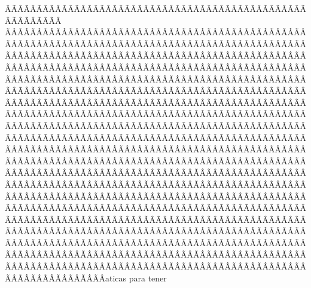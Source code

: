 \begin{sumilla}
\begin{fundamentacion}
ÂÃÂÃÂÃÂÃÂÃÂÃÂÃÂÃÂÃÂÃÂÃÂÃÂÃÂÃÂÃÂÃÂÃÂÃÂÃÂÃÂÃÂÃÂÃÂÃÂÃÂÃÂÃÂÃÂÃÂÃÂÃÂÃÂÃÂÃÂÃÂÃÂÃÂÃÂÃÂÃÂÃÂÃÂÃÂÃÂÃÂÃÂÃÂÃÂÃÂÃÂÃÂÃÂÃÂÃÂÃÂÃÂÃÂÃÂÃÂÃÂÃÂÃÂÃÂÃÂÃÂÃÂÃÂÃÂÃÂÃÂÃÂÃÂÃÂÃÂÃÂÃÂÃÂÃÂÃÂÃÂÃÂÃÂÃÂÃÂÃÂÃÂÃÂÃÂÃÂÃÂÃÂÃÂÃÂÃÂÃÂÃÂÃÂÃÂÃÂÃÂÃÂÃÂÃÂÃÂÃÂÃÂÃÂÃÂÃÂÃÂÃÂÃÂÃÂÃÂÃÂÃÂÃÂÃÂÃÂÃÂÃÂÃÂÃÂÃÂÃÂÃÂÃÂÃÂÃÂÃÂÃÂÃÂÃÂÃÂÃÂÃÂÃÂÃÂÃÂÃÂÃÂÃÂÃÂÃÂÃÂÃÂÃÂÃÂÃÂÃÂÃÂÃÂÃÂÃÂÃÂÃÂÃÂÃÂÃÂÃÂÃÂÃÂÃÂÃÂÃÂÃÂÃÂÃÂÃÂÃÂÃÂÃÂÃÂÃÂÃÂÃÂÃÂÃÂÃÂÃÂÃÂÃÂÃÂÃÂÃÂÃÂÃÂÃÂÃÂÃÂÃÂÃÂÃÂÃÂÃÂÃÂÃÂÃÂÃÂÃÂÃÂÃÂÃÂÃÂÃÂÃÂÃÂÃÂÃÂÃÂÃÂÃÂÃÂÃÂÃÂÃÂÃÂÃÂÃÂÃÂÃÂÃÂÃÂÃÂÃÂÃÂÃÂÃÂÃÂÃÂÃÂÃÂÃÂÃÂÃÂÃÂÃÂÃÂÃÂÃÂÃÂÃÂÃÂÃÂÃÂÃÂÃÂÃÂÃÂÃÂÃÂÃÂÃÂÃÂÃÂÃÂÃÂÃÂÃÂÃÂÃÂÃÂÃÂÃÂÃÂÃÂÃÂÃÂÃÂÃÂÃÂÃÂÃÂÃÂÃÂÃÂÃÂÃÂÃÂÃÂÃÂÃÂÃÂÃÂÃÂÃÂÃÂÃÂÃÂÃÂÃÂÃÂÃÂÃÂÃÂÃÂÃÂÃÂÃÂÃÂÃÂÃÂÃÂÃÂÃÂÃÂÃÂÃÂÃÂÃÂÃÂÃÂÃÂÃÂÃÂÃÂÃÂÃÂÃÂÃÂÃÂÃÂÃÂÃÂÃÂÃÂÃÂÃÂÃÂÃÂÃÂÃÂÃÂÃÂÃÂÃÂÃÂÃÂÃÂÃÂÃÂÃÂÃÂÃÂÃÂÃÂÃÂÃÂÃÂÃÂÃÂÃÂÃÂÃÂÃÂÃÂÃÂÃÂÃÂÃÂÃÂÃÂÃÂÃÂÃÂÃÂÃÂÃÂÃÂÃÂÃÂÃÂÃÂÃÂÃÂÃÂÃÂÃÂÃÂÃÂÃÂÃÂÃÂÃÂÃÂÃÂÃÂÃÂÃÂÃÂÃÂÃÂÃÂÃÂÃÂÃÂÃÂÃÂÃÂÃÂÃÂÃÂÃÂÃÂÃÂÃÂÃÂÃÂÃÂÃÂÃÂÃÂÃÂÃÂÃÂÃÂÃÂÃÂÃÂÃÂÃÂÃÂÃÂÃÂÃÂÃÂÃÂÃÂÃÂÃÂÃÂÃÂÃÂÃÂÃÂÃÂÃÂÃÂÃÂÃÂÃÂÃÂÃÂÃÂÃÂÃÂÃÂÃÂÃÂÃÂÃÂÃÂÃÂÃÂÃÂÃÂÃÂÃÂÃÂÃÂÃÂÃÂÃÂÃÂÃÂÃÂÃÂÃÂÃÂÃÂÃÂÃÂÃÂÃÂÃÂÃÂÃÂÃÂÃÂÃÂÃÂÃÂÃÂÃÂÃÂÃÂÃÂÃÂÃÂÃÂÃÂÃÂÃÂÃÂÃÂÃÂÃÂÃÂÃÂÃÂÃÂÃÂÃÂÃÂÃÂÃÂÃÂÃÂÃÂÃÂÃÂÃÂÃÂÃÂÃÂÃÂÃÂÃÂÃÂÃÂÃÂÃÂÃÂÃÂÃÂÃÂÃÂÃÂÃÂÃÂÃÂÃÂÃÂÃÂÃÂÃÂÃÂÃÂÃÂÃÂaticas para tener 
\end{fundamentacion}
\end{sumilla}

